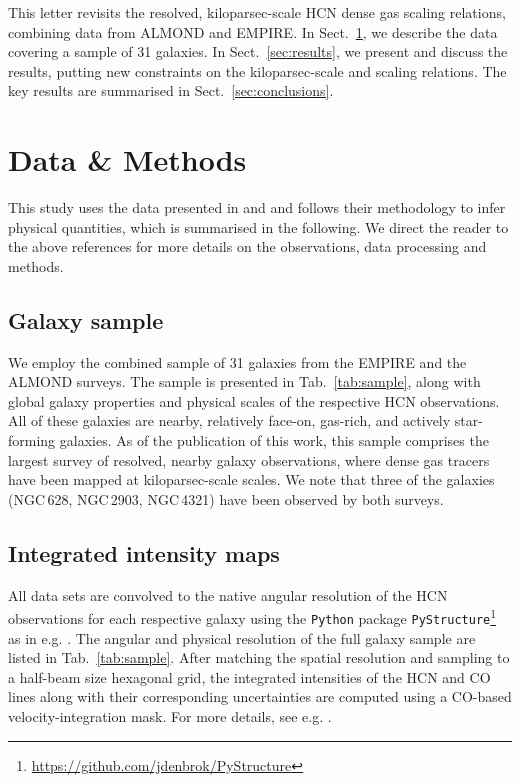 \documentclass[letter, longauth]{aa} %
\begin{document}
This letter revisits the resolved, kiloparsec-scale HCN dense gas scaling relations, combining data from ALMOND and EMPIRE.
In Sect.~\ref{sec:data}, we describe the data covering a sample of 31 galaxies. 
In Sect.~\ref{sec:results}, we present and discuss the results, putting new constraints on the kiloparsec-scale \fdense and \sfedense scaling relations.
The key results are summarised in Sect.~\ref{sec:conclusions}.



\section{Data \& Methods}
\label{sec:data}

This study uses the data presented in \citet{Jimenez-Donaire2019} and \citet{Neumann2023a} and follows their methodology to infer physical quantities, which is summarised in the following.
We direct the reader to the above references for more details on the observations, data processing and methods.


\subsection{Galaxy sample}
We employ the combined sample of 31 galaxies from the EMPIRE and the ALMOND surveys.
The sample is presented in Tab.~\ref{tab:sample}, along with global galaxy properties and physical scales of the respective HCN observations.
All of these galaxies are nearby, relatively face-on, gas-rich, and actively star-forming galaxies.
As of the publication of this work, this sample comprises the largest survey of resolved, nearby galaxy observations, where dense gas tracers have been mapped at kiloparsec-scale scales.
We note that three of the galaxies (NGC\,628, NGC\,2903, NGC\,4321) have been observed by both surveys.

\subsection{Integrated intensity maps}
\label{sec:data:mom0}
All data sets are convolved to the native angular resolution of the HCN observations for each respective galaxy using the \texttt{Python} package \texttt{PyStructure}\footnote{\url{https://github.com/jdenbrok/PyStructure}} as in e.g. \citet{Neumann2023a}.
The angular and physical resolution of the full galaxy sample are listed in Tab.~\ref{tab:sample}.
After matching the spatial resolution and sampling to a half-beam size hexagonal grid, the integrated intensities of the HCN and CO lines along with their corresponding uncertainties are computed using a CO-based velocity-integration mask.
For more details, see e.g. \citet{Neumann2023a}.
\end{document}
